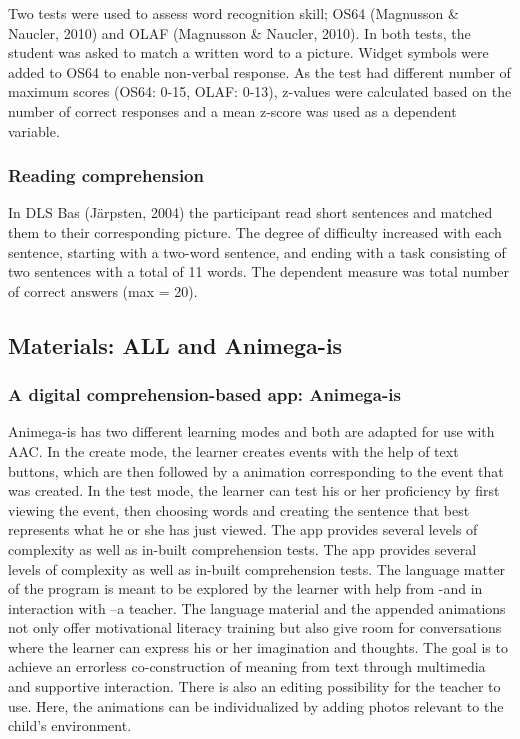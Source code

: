 \documentclass[
  ,
]{article}
\begin{document}
Two tests were used to assess word recognition skill; OS64 (Magnusson \&
Naucler, 2010) and OLAF (Magnusson \& Naucler, 2010). In both tests, the
student was asked to match a written word to a picture. Widget symbols
were added to OS64 to enable non-verbal response. As the test had
different number of maximum scores (OS64: 0-15, OLAF: 0-13), z-values
were calculated based on the number of correct responses and a mean
z-score was used as a dependent variable.

\hypertarget{reading-comprehension}{%
\subsubsection{Reading comprehension}\label{reading-comprehension}}

In DLS Bas (Järpsten, 2004) the participant read short sentences and
matched them to their corresponding picture. The degree of difficulty
increased with each sentence, starting with a two-word sentence, and
ending with a task consisting of two sentences with a total of 11 words.
The dependent measure was total number of correct answers (max = 20).

\hypertarget{materials-all-and-animega-is}{%
\subsection{Materials: ALL and
Animega-is}\label{materials-all-and-animega-is}}

\hypertarget{a-digital-comprehension-based-app-animega-is}{%
\subsubsection{A digital comprehension-based app:
Animega-is}\label{a-digital-comprehension-based-app-animega-is}}

Animega-is has two different learning modes and both are adapted for use
with AAC. In the create mode, the learner creates events with the help
of text buttons, which are then followed by a animation corresponding to
the event that was created. In the test mode, the learner can test his
or her proficiency by first viewing the event, then choosing words and
creating the sentence that best represents what he or she has just
viewed. The app provides several levels of complexity as well as
in-built comprehension tests. The app provides several levels of
complexity as well as in-built comprehension tests. The language matter
of the program is meant to be explored by the learner with help from
-and in interaction with --a teacher. The language material and the
appended animations not only offer motivational literacy training but
also give room for conversations where the learner can express his or
her imagination and thoughts. The goal is to achieve an errorless
co-construction of meaning from text through multimedia and supportive
interaction. There is also an editing possibility for the teacher to
use. Here, the animations can be individualized by adding photos
relevant to the child's environment.
\end{document}
